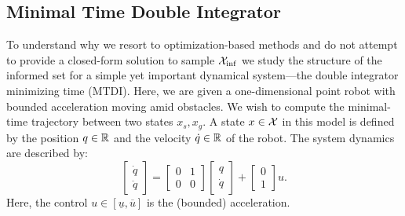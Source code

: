 \documentclass[letterpaper, 10 pt, conference]{ieeeconf}  %
\begin{document}


\subsection{Minimal Time Double Integrator}
To understand why we resort to optimization-based methods and do not attempt to provide a closed-form solution to sample $\mathcal{X}_{\rm {inf}}$ we study the structure of the informed set for a simple yet important dynamical system---the double integrator minimizing time (MTDI). 
Here, we are given a one-dimensional point robot with bounded acceleration moving amid obstacles. We wish to compute the minimal-time trajectory between two states $x_s, x_g$.
A state $x \in \mathcal{X}$ in this model is defined by 
the position $q \in \mathbb{R}$
and
the velocity $\dot{q}\in \mathbb{R}$ of the robot.
The system dynamics are described by:
\begin{equation}
\begin{bmatrix}
	\dot{q} \\
	\ddot{q}
\end{bmatrix}
=
\begin{bmatrix}
	0 & 1 \\
	0 & 0
\end{bmatrix}
\begin{bmatrix}
	{q} \\
	\dot{q}
\end{bmatrix}
+
\begin{bmatrix}
	0 \\
	1
\end{bmatrix}
u.
\end{equation}
Here, the control 
$u \in [\underline{u}, \overline{u}]$ 
is the (bounded) acceleration.
\end{document}
